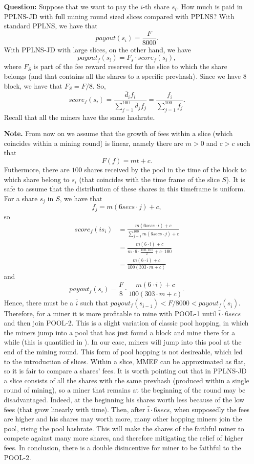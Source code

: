\documentclass[11pt]{article}
\begin{document}
\textbf{Question:} Suppose that we want to pay the $i$-th share $s_i$. How much is paid in PPLNS-JD with full mining round sized slices compared with PPLNS?
With standard PPLNS, we have that
\[payout(s_i) = \frac{F}{8000}.\]
With PPLNS-JD with large slices, on the other hand, we have
\[payout_f(s_i) = F_s\cdot score_f(s_i),\]
where $F_S$ is part of the fee reward reserved for the slice to which the share belongs (and that contains all the shares to a specific prevhash). Since we have $8$ block, we have that $F_S = F/8$. So,
\[score_f(s_i) = \frac{\bar d_i f_i}{\sum_{j=1}^{100} \bar d_j f_j}= \frac{ f_i}{\sum_{j=1}^{100} f_j}. \]
Recall that all the miners have the same hashrate.

\textbf{Note.} From now on we assume that the growth of fees within a slice (which coincides within a mining round) is linear, namely there are $m>0$ and $c>c$ such that
\[F(f) = mt+c.\]
Futhermore, there are $100$ shares received by the pool in the time of the block to which share belong to $s_i$ (that coincides with the time frame of the slice $S$). It is safe to assume that the distribution of these shares in this timeframe is uniform. For a share $s_j$ in $S$, we have that
\[ f_j = m(6secs \cdot j) +c,\]
so
\begin{align*}
	score_f(is_i) & = \frac{m(6secs\cdot i) +c}{\sum_{j=1}^{100} m(6secs\cdot j) +c}        \\
	              & = \frac{m(6\cdot i) +c}{m\cdot 6\cdot\frac{100\cdot101}{2} +c\cdot 100} \\
	              & = \frac{m(6\cdot i) +c}{100(303\cdot m +c)}
\end{align*}
and
\[payout_f(s_i) = \frac{F}{8} \cdot \frac{m(6\cdot i) +c}{100(303\cdot m +c)}.\]
Hence, there must be a $\bar i$ such that $payout_f(s_{\bar i -1})< F/8000<payout_f(s_{\bar i })$.
Therefore, for a miner it is more profitable to mine with POOL-1 until $\bar i \cdot 6 secs$ and then join POOL-2. This is a slight variation of classic pool hopping, in which the miners jump into a pool that has just found a block and mine there for a while (this is quantified in \cite{rosenfeld}). In our case, miners will jump into this pool at the end of the mining round. This form of pool hopping is not desireable, which led to the introduction of slices. Within a slice, MMEF can be approximated as flat, so it is fair to compare a shares' fees.
It is worth pointing out that in PPLNS-JD a slice consists of all the shares with the same prevhash (produced within a single round of mining), so a miner that remains at the beginning of the round may be disadvantaged. Indeed, at the beginning his shares worth less because of the low fees (that grow linearly with time). Then, after $\bar i \cdot 6 secs$, when supposedly the fees are higher and his shares may worth more, many other hopping miners join the pool, rising the pool hashrate. This will make the shares of the faithful miner to compete against many more shares, and therefore mitigating the relief of higher fees. In conclusion, there is a double disincentive for miner to be faithful to the POOL-2.
\end{document}
